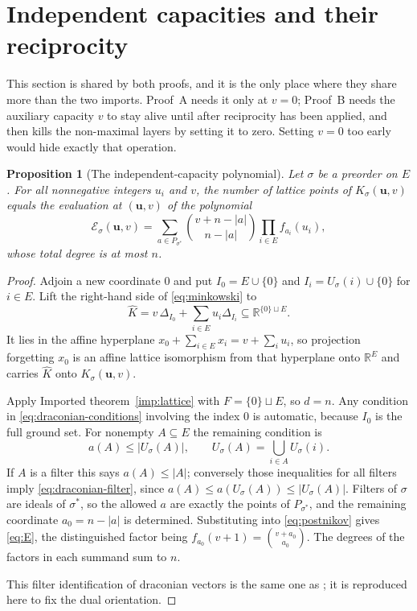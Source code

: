 \documentclass[11pt]{article}
\numberwithin{equation}{section}
\newtheorem{proposition}[theorem]{Proposition}
\theoremstyle{definition}
\theoremstyle{remark}
\newcommand{\R}{\mathbb R}
\newcommand{\Ecal}{\mathcal E}
\begin{document}
\section{Independent capacities and their reciprocity}
\label{sec:weighted}

This section is shared by both proofs, and it is the only place where they
share more than the two imports. Proof~A needs it only at $v=0$; Proof~B needs
the auxiliary capacity $v$ to stay alive until after reciprocity has been
applied, and then kills the non-maximal layers by setting it to zero. Setting
$v=0$ too early would hide exactly that operation.

\begin{proposition}[The independent-capacity polynomial]
\label{prop:count}
Let $\sigma$ be a preorder on $E$. For all nonnegative integers $u_i$ and $v$,
the number of lattice points of $K_\sigma(\mathbf u,v)$ equals the evaluation
at $(\mathbf u,v)$ of the polynomial
\begin{equation}
 \Ecal_\sigma(\mathbf u,v)=
 \sum_{a\in P_{\sigma^*}}
 \binom{v+n-|a|}{n-|a|}
 \prod_{i\in E}f_{a_i}(u_i),
 \label{eq:E}
\end{equation}
whose total degree is at most $n$.
\end{proposition}

\begin{proof}
Adjoin a new coordinate $0$ and put $I_0=E\cup\{0\}$ and
$I_i=U_\sigma(i)\cup\{0\}$ for $i\in E$. Lift the right-hand side of
\eqref{eq:minkowski} to
\[
 \widehat K=v\,\Delta_{I_0}+\sum_{i\in E}u_i\Delta_{I_i}
 \subseteq\R^{\{0\}\sqcup E}.
\]
It lies in the affine hyperplane $x_0+\sum_{i\in E}x_i=v+\sum_iu_i$, so
projection forgetting $x_0$ is an affine lattice isomorphism from that
hyperplane onto $\R^E$ and carries $\widehat K$ onto $K_\sigma(\mathbf u,v)$.

Apply Imported theorem~\ref{imp:lattice} with $F=\{0\}\sqcup E$, so $d=n$. Any
condition in \eqref{eq:draconian-conditions} involving the index $0$ is
automatic, because $I_0$ is the full ground set. For nonempty $A\subseteq E$
the remaining condition is
\begin{equation}
 a(A)\le|U_\sigma(A)|,\qquad U_\sigma(A)=\bigcup_{i\in A}U_\sigma(i).
 \label{eq:draconian-filter}
\end{equation}
If $A$ is a filter this says $a(A)\le|A|$; conversely those inequalities for
all filters imply \eqref{eq:draconian-filter}, since
$a(A)\le a(U_\sigma(A))\le|U_\sigma(A)|$. Filters of $\sigma$ are ideals of
$\sigma^*$, so the allowed $a$ are exactly the points of $P_{\sigma^*}$, and
the remaining coordinate $a_0=n-|a|$ is determined. Substituting into
\eqref{eq:postnikov} gives \eqref{eq:E}, the distinguished factor being
$f_{a_0}(v+1)=\binom{v+a_0}{a_0}$. The degrees of the factors in each summand
sum to $n$.

This filter identification of draconian vectors is the same one as
\cite[Lemma~4.1]{AC}; it is reproduced here to fix the dual orientation.
\end{proof}
\end{document}
